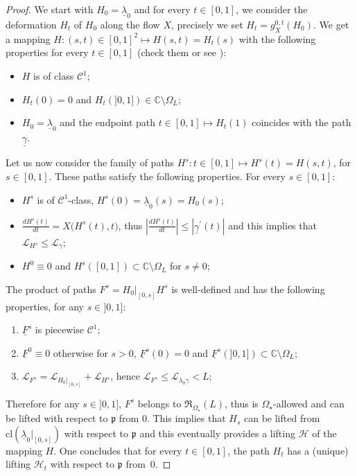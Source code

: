 \documentclass[11pt, english]{smfart}
\theoremstyle{definition}
\begin{document}
\begin{proof}
We start with $H_0 = \underline{\lambda}_0$ and for every $t \in
[0,1]$, we consider the deformation $H_t$ of
$H_0$ along the flow $X$, precisely we set
$H_t = g_X^{0,t}(H_0)$. We get a mapping $H : (s,t)\in
[0,1]^2 \mapsto H(s,t) = H_t(s)$ with the following properties for
every $t \in [0,1]$ (check them or see \cite{S012, S014}):
\begin{itemize}
\item $H$ is of class $\mathcal{C}^1$;
\item $H_t(0)=0$ and $H_t(]0,1]) \in \mathbb{C} \setminus \Omega_L$;
\item $H_0 = \underline{\lambda}_0$ and 
the endpoint path $t \in [0,1] \mapsto H_t(1)$ coincides with
  the path $\underline{\gamma}$.
\end{itemize}
Let us now consider the family of paths $H^s : t \in [0,1] \mapsto
H^s(t)=H(s,t)$, for $s \in [0,1]$. These paths satisfy the following
properties. For every $s \in [0,1]$:
\begin{itemize}
\item $H^s$ is of $\mathcal{C}^1$-class, $H^s(0)= \underline{\lambda}_0(s)=H_0(s)$;
\item $\displaystyle \frac{dH^s(t)}{dt} = X\big(H^s(t),t \big)$, thus
  $\left|\frac{dH^s(t)}{dt}\right| \leq
  |\underline{\gamma}^\prime(t)|$ and this
  implies that $\mathcal{L}_{H^s} \leq \mathcal{L}_{\gamma}$;
\item  $H^0 \equiv 0$ and $H^s([0,1]) \subset \mathbb{C}  \setminus \Omega_L$ for $s \neq 0$;
\end{itemize}
The product of  paths $F^s = H_0|_{[0,s]} H^s$ is well-defined and has the following
properties, for any $s \in ]0,1]$: 
\begin{enumerate}
\item $\underline{F}^s$ is piecewise $\mathcal{C}^1$;
\item $\underline{F}^0 \equiv 0$ otherwise for $s>0$, 
 $\underline{F}^s(0)=0$ and $\underline{F}^s(]0,1]) \subset \mathbb{C}  \setminus \Omega_L$;
\item $\mathcal{L}_{F^s} =
  \mathcal{L}_{H_0|_{[0,s]}} + \mathcal{L}_{H^s}$, hence $\mathcal{L}_{F^s} 
  \leq \mathcal{L}_{\lambda_0 \gamma} <L$;
\end{enumerate}
Therefore for any $s \in ]0,1]$, $F^s$ belongs to
$\mathfrak{R}_{\Omega_\star}(L)$, thus is $\Omega_\star$-allowed and
can be lifted with respect 
to $\mathfrak{p}$ from $0$. This implies that $H_s$ can be lifted from
$\mathrm{cl}(\underline{\lambda}_0|_{[0,s]})$ with respect
to $\mathfrak{p}$ and this eventually provides a lifting $\mathcal{H}$ of
the mapping $H$.  One concludes that for every $t \in [0,1]$, the path
$H_t$ has a (unique) lifting $\mathcal{H}_t$ with respect to
$\mathfrak{p}$ from~$0$.


\end{proof}
\end{document}
